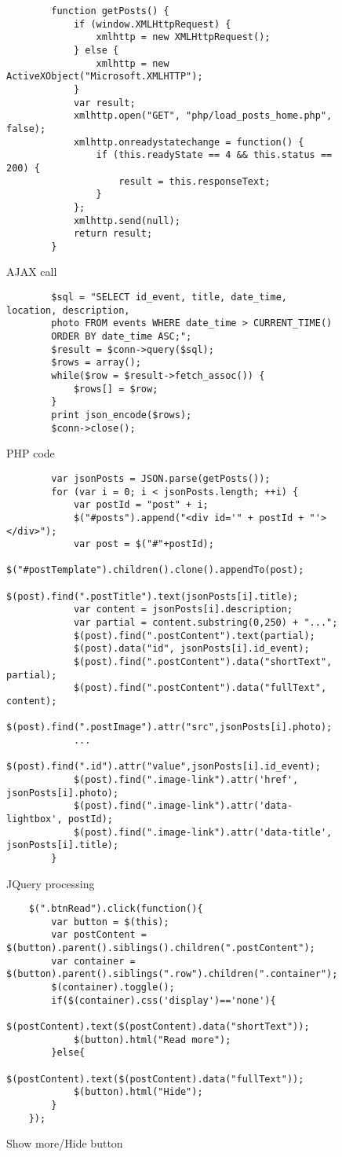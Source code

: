 \documentclass[a4paper]{article}
\begin{document}
	\begin{figure}
		\centering
		\begin{BVerbatim}
		function getPosts() {
			if (window.XMLHttpRequest) {
				xmlhttp = new XMLHttpRequest();
			} else {
				xmlhttp = new ActiveXObject("Microsoft.XMLHTTP");
			}
			var result;
			xmlhttp.open("GET", "php/load_posts_home.php", false);
			xmlhttp.onreadystatechange = function() {
				if (this.readyState == 4 && this.status == 200) {
					result = this.responseText;
				}
			};
			xmlhttp.send(null);
			return result;
		}
		\end{BVerbatim}
		\caption{AJAX call}
		\label{fig:AJAX}
	\end{figure}
	\begin{figure}
		\centering
		\begin{BVerbatim}
		$sql = "SELECT id_event, title, date_time, location, description, 
		photo FROM events WHERE date_time > CURRENT_TIME()
		ORDER BY date_time ASC;";
		$result = $conn->query($sql);
		$rows = array();
		while($row = $result->fetch_assoc()) {
			$rows[] = $row;
		}
		print json_encode($rows);
		$conn->close();
		\end{BVerbatim}
		\caption{PHP code}
		\label{fig:PHP}
	\end{figure}

	\begin{figure}
		\centering
		\begin{BVerbatim}
		var jsonPosts = JSON.parse(getPosts());
		for (var i = 0; i < jsonPosts.length; ++i) {
			var postId = "post" + i;
			$("#posts").append("<div id='" + postId + "'></div>");
			var post = $("#"+postId);
			$("#postTemplate").children().clone().appendTo(post);
			$(post).find(".postTitle").text(jsonPosts[i].title);
			var content = jsonPosts[i].description;
			var partial = content.substring(0,250) + "...";
			$(post).find(".postContent").text(partial);
			$(post).data("id", jsonPosts[i].id_event);
			$(post).find(".postContent").data("shortText", partial);
			$(post).find(".postContent").data("fullText", content);
			$(post).find(".postImage").attr("src",jsonPosts[i].photo);
			...
			$(post).find(".id").attr("value",jsonPosts[i].id_event);
			$(post).find(".image-link").attr('href', jsonPosts[i].photo);
			$(post).find(".image-link").attr('data-lightbox', postId);
			$(post).find(".image-link").attr('data-title', jsonPosts[i].title);
		}
		\end{BVerbatim}
		\caption{JQuery processing}
		\label{fig:JQuery}
	\end{figure}
	\begin{figure}
	\centering
	\begin{BVerbatim}
	$(".btnRead").click(function(){
		var button = $(this);
		var postContent = $(button).parent().siblings().children(".postContent");
		var container = $(button).parent().siblings(".row").children(".container");
		$(container).toggle(); 
		if($(container).css('display')=='none'){
			$(postContent).text($(postContent).data("shortText"));
			$(button).html("Read more");
		}else{
			$(postContent).text($(postContent).data("fullText"));
			$(button).html("Hide");
		}
	});
	\end{BVerbatim}
	\caption{Show more/Hide button}
	\label{fig:butt}
\end{figure}
\end{document}
